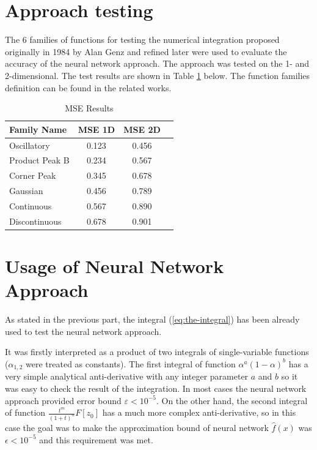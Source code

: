 \documentclass[%
]{ittmm}
\begin{document}
\section{Approach testing}

The 6 families of functions for testing the numerical integration proposed originally in 1984 by Alan Genz\cite{genz} and refined later were used to evaluate the accuracy of the neural network approach. The approach was tested on the 1- and 2-dimensional. The test results are shown in Table \ref{tab:mse_results} below. The function families definition can be found in the related works.

\begin{table}[htbp]
\centering
\caption{MSE Results}
\begin{tabular}{lccc}
\toprule
Family Name & MSE 1D & MSE 2D \\
\midrule
Oscillatory & 0.123 & 0.456 \\
Product Peak B & 0.234 & 0.567 \\
Corner Peak & 0.345 & 0.678 \\
Gaussian & 0.456 & 0.789 \\
Continuous & 0.567 & 0.890 \\
Discontinuous & 0.678 & 0.901 \\
\bottomrule
\end{tabular}
\label{tab:mse_results}
\end{table}

\section{Usage of Neural Network Approach}

As stated in the previous part, the integral (\ref{eq:the-integral}) has been already used to test the neural network approach. 

It was firstly interpreted as a product of two integrals of single-variable functions ($\alpha_{1,2}$ were treated as constants). The first integral of function $\alpha^{a}(1 - \alpha)^b$ has a very simple analytical anti-derivative with any integer parameter $a$ and $b$ so it was easy to check the result of the integration. In most cases the neural network approach provided error bound $\varepsilon < 10^{-5}$. On the other hand, the second integral of function $\frac{t^m}{(1+t)^n}F[z_{0}]$ has a much more complex anti-derivative, so in this case the goal was to make the approximation bound of neural network $\hat{f}(x)$ was $\epsilon < 10^{-5}$ and this requirement was met.
\end{document}
